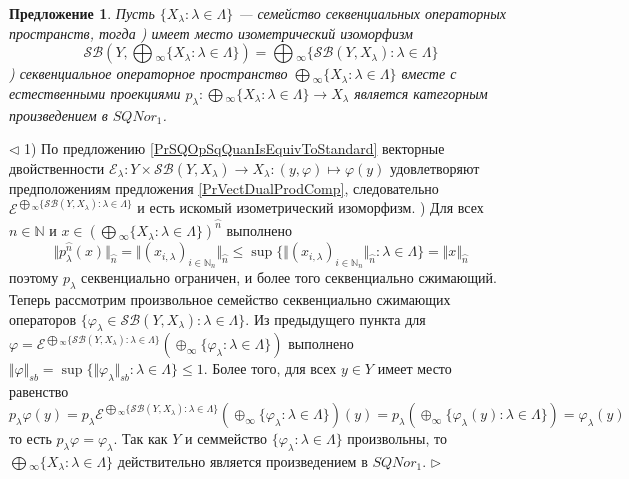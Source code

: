 \documentclass[12pt]{article}
\newtheorem{proposition}[theorem]{Предложение}
\newenvironment{proof}{\par $\triangleleft$}{$\triangleright$}
\begin{document}
\begin{proposition}\label{PrSQProdUnivProp} Пусть $\{X_\lambda:\lambda\in \Lambda\}$ --- семейство секвенциальных операторных пространств, тогда
) имеет место изометрический изоморфизм
$$
\mathcal{SB}\left(Y,\bigoplus{}_\infty\{X_\lambda:\lambda\in\Lambda\}\right)
=\bigoplus{}_\infty\{\mathcal{SB}(Y,X_\lambda):\lambda\in\Lambda\}
$$
) секвенциальное операторное пространство $\bigoplus{}_\infty\{X_\lambda:\lambda\in\Lambda\}$ вместе с естественными проекциями $p_\lambda:\bigoplus{}_\infty\{X_\lambda:\lambda\in\Lambda\}\to X_\lambda$ является категорным произведением в $SQNor_1$.
\end{proposition}
\begin{proof} 1) По предложению \ref{PrSQOpSqQuanIsEquivToStandard} векторные двойственности $\mathcal{E}_\lambda:Y\times\mathcal{SB}(Y,X_\lambda)\to X_\lambda:(y,\varphi)\mapsto \varphi(y)$ удовлетворяют предположениям предложения \ref{PrVectDualProdComp}, следовательно $\mathcal{E}^{\bigoplus{}_\infty\{\mathcal{SB}(Y,X_\lambda):\lambda\in\Lambda\}}$ и есть искомый изометрический изоморфизм.
) Для всех $n\in\mathbb{N}$ и $x\in \left(\bigoplus{}_\infty\{X_\lambda:\lambda\in\Lambda\}\right)^{\wideparen{n}}$ выполнено
$$
\Vert p_\lambda^{\wideparen{n}}(x)\Vert_{\wideparen{n}}
=\Vert (x_{i,\lambda})_{i\in\mathbb{N}_n}\Vert_{\wideparen{n}}
\leq\sup\{\Vert (x_{i,\lambda})_{i\in\mathbb{N}_n}\Vert_{\wideparen{n}}:\lambda\in \Lambda\}
=\Vert x\Vert_{\wideparen{n}}
$$
поэтому $p_\lambda$ секвенциально ограничен, и более того секвенциально сжимающий. Теперь рассмотрим произвольное семейство секвенциально сжимающих операторов $\{\varphi_\lambda\in\mathcal{SB}(Y,X_\lambda):\lambda\in\Lambda\}$. Из предыдущего пункта для $\varphi=\mathcal{E}^{\bigoplus{}_\infty\{\mathcal{SB}(Y,X_\lambda):\lambda\in\Lambda\}}(\oplus_\infty\{\varphi_\lambda:\lambda\in\Lambda\})$ выполнено $\Vert\varphi\Vert_{sb}=\sup\{\Vert\varphi_\lambda\Vert_{sb}:\lambda\in\Lambda\}\leq 1$. Более того, для всех $y\in Y$ имеет место равенство
$$
p_\lambda\varphi(y)
=p_\lambda\mathcal{E}^{\bigoplus{}_\infty\{\mathcal{SB}(Y,X_\lambda):\lambda\in\Lambda\}}(\oplus_\infty\{\varphi_\lambda:\lambda\in\Lambda\})(y)
=p_\lambda(\oplus_\infty\{\varphi_\lambda(y):\lambda\in\Lambda\})=\varphi_\lambda(y)
$$
то есть $p_\lambda\varphi=\varphi_\lambda$. Так как $Y$ и семмейство $\{\varphi_\lambda:\lambda\in\Lambda\}$ произвольны, то $\bigoplus{}_\infty\{X_\lambda:\lambda\in\Lambda\}$ действительно является произведением в $SQNor_1$.
\end{proof}
\end{document}
